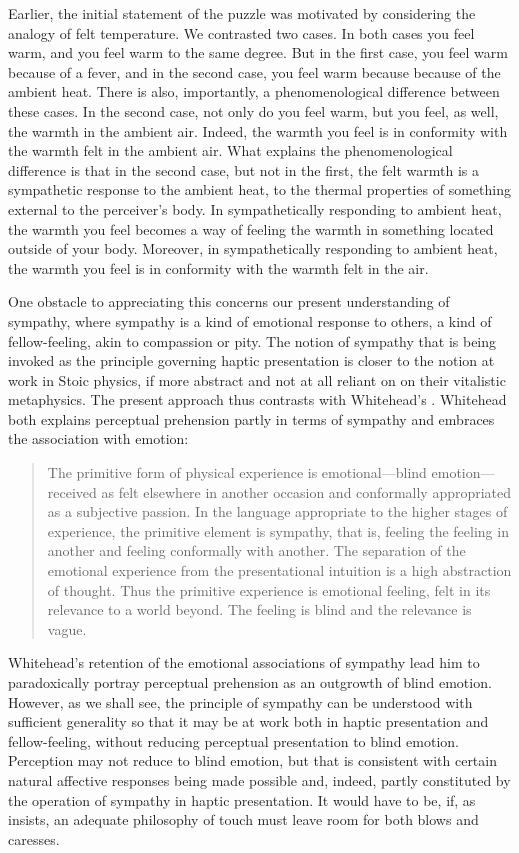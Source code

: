 Earlier, the initial statement of the puzzle was motivated by considering the analogy of felt temperature. We contrasted two cases. In both cases you feel warm, and you feel warm to the same degree. But in the first case, you feel warm because of a fever, and in the second case, you feel warm because because of the ambient heat. There is also, importantly, a phenomenological difference between these cases. In the second case, not only do you feel warm, but you feel, as well, the warmth in the ambient air. Indeed, the warmth you feel is in conformity with the warmth felt in the ambient air. What explains the phenomenological difference is that in the second case, but not in the first, the felt warmth is a sympathetic response to the ambient heat, to the thermal properties of something external to the perceiver's body. In sympathetically responding to ambient heat, the warmth you feel becomes a way of feeling the warmth in something located outside of your body. Moreover, in sympathetically responding to ambient heat, the warmth you feel is in conformity with the warmth felt in the air.

One obstacle to appreciating this concerns our present understanding of sympathy, where sympathy is a kind of emotional response to others, a kind of fellow-feeling, akin to compassion or pity. The notion of sympathy that is being invoked as the principle governing haptic presentation is closer to the notion at work in Stoic physics, if more abstract and not at all reliant on on their vitalistic metaphysics. The present approach thus contrasts with Whitehead's \citeyearpar{Whitehead:1978zr}. Whitehead both explains perceptual prehension partly in terms of sympathy and embraces the association with emotion:
\begin{quote}
	The primitive form of physical experience is emotional---blind emotion---received as felt elsewhere in another occasion and conformally appropriated as a subjective passion. In the language appropriate to the higher stages of experience, the primitive element is sympathy, that is, feeling the feeling in another and feeling conformally with another. The separation of the emotional experience from the presentational intuition is a high abstraction of thought. Thus the primitive experience is emotional feeling, felt in its relevance to a world beyond. The feeling is blind and the relevance is vague. \citep[162-3]{Whitehead:1978zr}
\end{quote}
Whitehead's retention of the emotional associations of sympathy lead him to paradoxically portray perceptual prehension as an outgrowth of blind emotion. However, as we shall see, the principle of sympathy can be understood with sufficient generality so that it may be at work both in haptic presentation and fellow-feeling, without reducing perceptual presentation to blind emotion. Perception may not reduce to blind emotion, but that is consistent with certain natural affective responses being made possible and, indeed, partly constituted by the operation of sympathy in haptic presentation. It would have to be, if, as \citet[chapter 4]{Derrida:2005aa} insists, an adequate philosophy of touch must leave room for both blows and caresses.

